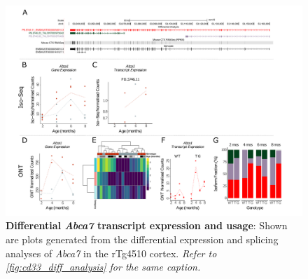 \begin{landscape}
	\begin{figure}[htp]
		\begin{center}
			\includegraphics[page=2,trim={0 0.5cm 0 1.5cm},scale =0.85]{Figures/TargetGene_DifferentialAnalysis.pdf}
		\end{center}
		\captionsetup{width=1.5\textwidth}
		\caption[Differential \textit{Abca7} transcript expression and usage]%
		{\textbf{Differential \textit{Abca7} transcript expression and usage}: Shown are plots generated from the differential expression and splicing analyses of \textit{Abca7} in the rTg4510 cortex. \textit{Refer to \cref{fig:cd33_diff_analysis} for the same caption.}}   
		\label{fig:abca7_diff_analysis}
	\end{figure}
\end{landscape}

